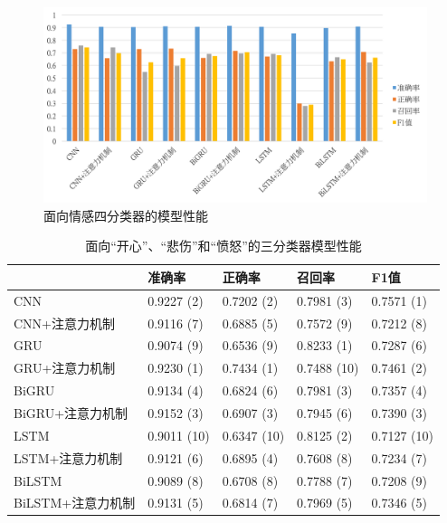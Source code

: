 \begin{figure}[H]
  \centering
  \includegraphics[width=\textwidth]{img/exp_context_emo_0_result_bar.png}
  \caption{面向情感四分类器的模型性能}
  \label{fig:exp_context_emo_0_result_bar}
\end{figure}

\begin{table}[htb]
  \centering
  \begin{minipage}[t]{\linewidth}
  \caption{面向“开心”、“悲伤”和“愤怒”的三分类器模型性能}
  \label{tab:exp_context_emo_b_result}
    \begin{tabularx}{\linewidth}{X|llll}
    \toprule[1.5pt]
    & 准确率 & 正确率 & 召回率 & F1值 \\
    \hline
    CNN & 0.9227 (2) & 0.7202 (2) & 0.7981 (3) & 0.7571 (1) \\ %
    CNN+注意力机制 & 0.9116 (7) & 0.6885 (5) & 0.7572 (9) & 0.7212 (8) \\ %
    \hline
    GRU & 0.9074 (9) & 0.6536 (9) & 0.8233 (1) & 0.7287 (6) \\ %
    GRU+注意力机制 & 0.9230 (1) & 0.7434 (1) & 0.7488 (10) & 0.7461 (2) \\ %
    \hline
    BiGRU & 0.9134 (4) & 0.6824 (6) & 0.7981 (3) & 0.7357 (4) \\ %
    BiGRU+注意力机制 & 0.9152 (3) & 0.6907 (3) & 0.7945 (6) & 0.7390 (3) \\ %
    \hline
    LSTM & 0.9011 (10) & 0.6347 (10) & 0.8125 (2) & 0.7127 (10) \\ %
    LSTM+注意力机制 & 0.9121 (6) & 0.6895 (4) & 0.7608 (8) & 0.7234 (7) \\ %
    \hline
    BiLSTM & 0.9089 (8) & 0.6708 (8) & 0.7788 (7) & 0.7208 (9) \\ %
    BiLSTM+注意力机制 & 0.9131 (5) & 0.6814 (7) & 0.7969 (5) & 0.7346 (5) \\ %
    \bottomrule[1.5pt]
    \end{tabularx}
  \end{minipage}
\end{table}

